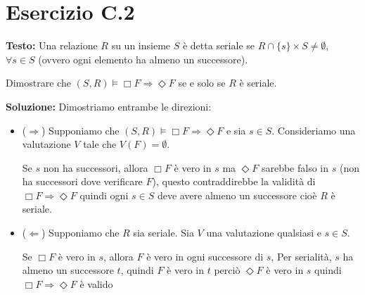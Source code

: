 \documentclass[a4paper,12pt]{article}
\newcommand{\esercizio}[2]{%
    \textbf{Testo:}
    #1
    
    \vspace{1.5em}
    
    \textbf{Soluzione:}
    #2
}
\begin{document}
\section*{Esercizio C.2}
\esercizio{%
    Una relazione $R$ su un insieme $S$ è detta seriale se
    $R \cap \{s\} \times S \neq \emptyset$, $\forall s \in S$ (ovvero ogni elemento ha almeno un successore).

    Dimostrare che $(S, R) \models \Box F \Rightarrow \Diamond F$ se e solo se $R$ è seriale.
}{%
    Dimostriamo entrambe le direzioni:
    \begin{itemize}
        \item  ($\Rightarrow$) Supponiamo che $(S,R) \models \Box F \Rightarrow \Diamond F$ e sia $s \in S$. Consideriamo una valutazione $V$ tale che $V(F) = \emptyset$.

              Se $s$ non ha successori, allora $\Box F$ è vero in $s$ ma $\Diamond F$ sarebbe falso in $s$ (non ha successori dove verificare $F$), questo contraddirebbe la validità di $\Box F \Rightarrow \Diamond F$ quindi ogni $s \in S$ deve avere almeno un successore cioè $R$ è seriale.

        \item ($\Leftarrow$) Supponiamo che $R$ sia seriale. Sia $V$ una valutazione qualsiasi e $s \in S$.

              Se $\Box F$ è vero in $s$, allora $F$ è vero in ogni successore di $s$, Per serialità, $s$ ha almeno un successore $t$, quindi $F$ è vero in $t$ perciò $\Diamond F$ è vero in $s$ quindi $\Box F \Rightarrow \Diamond F$ è valido
    \end{itemize}
}
\end{document}
